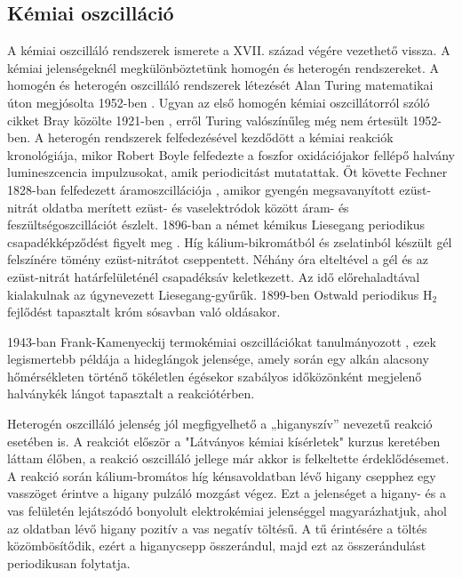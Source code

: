 \subsection{Kémiai oszcilláció}
A kémiai oszcilláló rendszerek ismerete a XVII. század végére vezethető vissza. A kémiai jelenségeknél megkülönböztetünk homogén és heterogén rendszereket. A homogén és heterogén oszcilláló rendszerek létezését Alan Turing matematikai úton megjósolta 1952-ben \cite{turing1952chemical}. Ugyan az első homogén kémiai oszcillátorról szóló cikket Bray közölte 1921-ben \cite{bray1921periodic}, erről Turing valószínűleg még nem értesült 1952-ben. A heterogén rendszerek felfedezésével kezdődött a kémiai reakciók kronológiája, mikor Robert Boyle \cite{harvey1957history} felfedezte a foszfor oxidációjakor fellépő halvány lumineszcencia impulzusokat, amik periodicitást mutatattak. Őt követte Fechner 1828-ban felfedezett áramoszcillációja \cite{fechner1828schweigg}, amikor gyengén megsavanyított ezüst-nitrát oldatba merített ezüst- és vaselektródok között áram- és feszültségoszcillációt észlelt. 1896-ban a német kémikus Liesegang periodikus csapadékképződést figyelt meg \cite{liesegang1896ueber}. Híg kálium-bikromátból és zselatinból készült gél felszínére tömény ezüst-nitrátot cseppentett. Néhány óra elteltével a gél és az ezüst-nitrát határfelületénél csapadéksáv keletkezett. Az idő előrehaladtával kialakulnak az úgynevezett Liesegang-gyűrűk. 1899-ben Ostwald \cite{ostwald1899jacobus} periodikus H$_2$ fejlődést tapasztalt króm sósavban való oldásakor.

1943-ban Frank-Kamenyeckij termokémiai oszcillációkat tanulmányozott \cite{frank1943nikov}, ezek legismertebb példája a hideglángok jelensége, amely során egy alkán alacsony hőmérsékleten történő tökéletlen égésekor szabályos időközönként megjelenő halványkék lángot tapasztalt a reakciótérben.

Heterogén oszcilláló jelenség jól megfigyelhető a „higanyszív” nevezetű reakció esetében is. A reakciót először a "Látványos kémiai kísérletek" kurzus keretében láttam élőben, a reakció oszcilláló jellege már akkor is felkeltette érdeklődésemet. A reakció során kálium-bromátos híg kénsavoldatban lévő higany csepphez egy vasszöget érintve a higany pulzáló mozgást végez. Ezt a jelenséget a higany- és a vas felületén lejátszódó bonyolult elektrokémiai jelenséggel magyarázhatjuk, ahol az oldatban lévő higany pozitív a vas negatív töltésű. A tű érintésére a töltés közömbösítődik, ezért a higanycsepp összerándul, majd ezt az összerándulást periodikusan folytatja.

